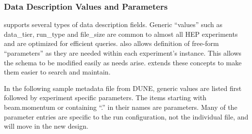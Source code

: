 \documentclass[../main-v1.tex]{subfiles}
\begin{document}
\subsubsection{Data Description Values and Parameters}

  supports several types of data description fields.
  Generic ``values'' such as data\_tier, run\_type and file\_size  are common to almost all  HEP experiments and are optimized for efficient queries.   also allows definition of free-form ``parameters'' as they are needed within each experiment's instance.  This allows the schema to be modified easily as needs arise.   extends these concepts to make them easier to search and maintain. 






In the following %
sample metadata file from DUNE, generic  values are listed first followed by experiment specific parameters. The items starting with beam.momentum or containing ``.'' in their names are parameters. Many of the parameter entries are specific to the run configuration, not the individual file, and will move in the new design. 
\end{document}
